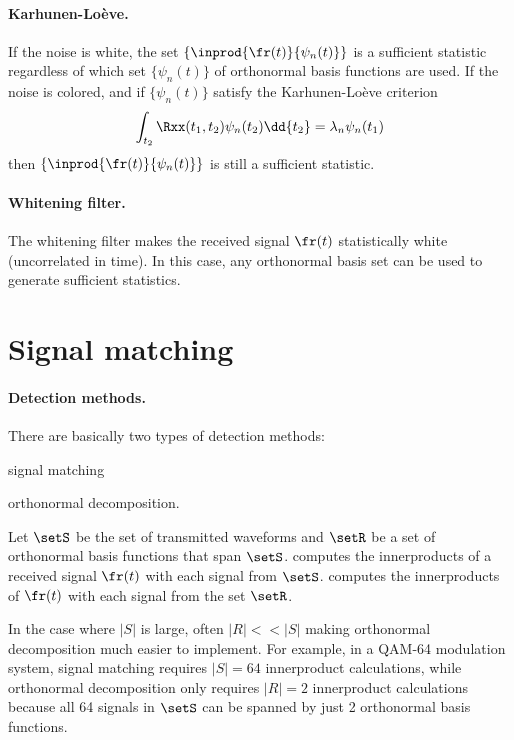 \paragraph{Karhunen-Lo\`{e}ve.}
If the noise is white, the set $\{\inprod{\fr(t)}{\psi_n(t)}\}$
is a sufficient statistic regardless of which
set $\{\psi_n(t)\}$ of orthonormal basis functions are used.
If the noise is colored, and if $\{\psi_n(t)\}$ satisfy the
Karhunen-Lo\`{e}ve criterion
   \[ \int_{t_2}\Rxx(t_1,t_2)\psi_n(t_2)\dd{t_2} = \lambda_n \psi_n(t_1) \]
then $\{\inprod{\fr(t)}{\psi_n(t)}\}$ is still a sufficient statistic.

\paragraph{Whitening filter.}
The whitening filter makes the received signal $\fr(t)$ statistically white
(uncorrelated in time). In this case,
any orthonormal basis set can be used to generate sufficient statistics.




\section{Signal matching}
\paragraph{Detection methods.}
There are basically two types of detection methods:
\begin{enume}
   \item signal matching
   \item orthonormal decomposition.
\end{enume}

Let $\setS$ be the set of transmitted waveforms and
$\setR$ be a set of orthonormal basis functions that span $\setS$.
 computes the innerproducts of a
received signal $\fr(t)$ with each signal from $\setS$.
 computes the innerproducts of
$\fr(t)$ with each signal from the set $\setR$.

In the case where $|S|$ is large, often $|R|<<|S|$
making orthonormal decomposition much easier to implement.
For example, in a QAM-64 modulation system,
signal matching requires $|S|=64$ innerproduct calculations,
while orthonormal decomposition only requires $|R|=2$
innerproduct calculations because all 64 signals in $\setS$ can be spanned
by just 2 orthonormal basis functions.


